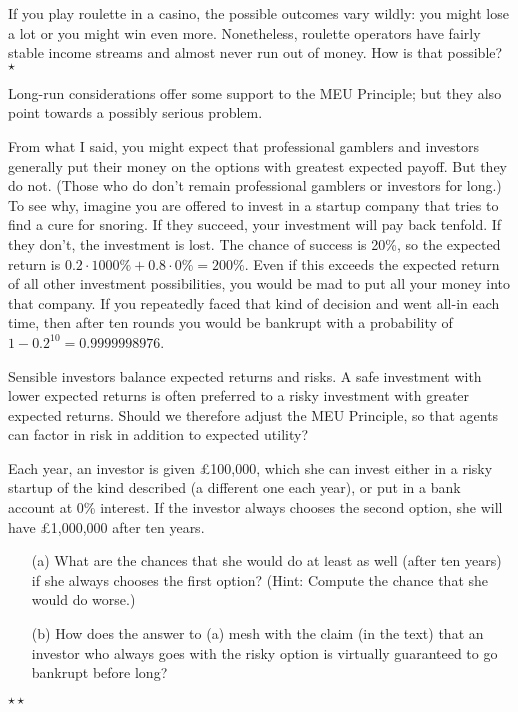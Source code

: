 \begin{exercise}
  If you play roulette in a casino, the possible outcomes vary wildly:
  you might lose a lot or you might win even more. Nonetheless,
  roulette operators have fairly stable income streams and almost
  never run out of money. How is that possible?  $\star$
\end{exercise}

Long-run considerations offer some support to the MEU Principle; but
they also point towards a possibly serious problem.

From what I said, you might expect that professional gamblers and
investors generally put their money on the options with greatest
expected payoff. But they do not. (Those who do don't remain
professional gamblers or investors for long.) To see why, imagine you
are offered to invest in a startup company that tries to find a cure
for snoring. If they succeed, your investment will pay back
tenfold. If they don't, the investment is lost. The chance of success
is 20\%, so the expected return is $0.2 \cdot 1000\% + 0.8 \cdot 0\% =
200\%$. Even if this exceeds the expected return of all other
investment possibilities, you would be mad to put all your money into
that company. If you repeatedly faced that kind of decision and went
all-in each time, then after ten rounds you would be bankrupt with a
probability of $1-0.2^{10} = 0.9999998976$.%

Sensible investors balance expected returns and risks. A safe
investment with lower expected returns is often preferred to a risky
investment with greater expected returns. Should we therefore adjust
the MEU Principle, so that agents can factor in risk in addition to
expected utility?

\begin{exercise}
  Each year, an investor is given £100,000, which she can invest
  either in a risky startup of the kind described (a different one
  each year), or put in a bank account at 0\% interest. If the
  investor always chooses the second option, she will have £1,000,000
  after ten years.
  \begin{enumerate}
  \item[(a)] What are the chances that she would do at least as well
    (after ten years) if she always chooses the first option? (Hint:
    Compute the chance that she would do worse.)
  \item[(b)] How does the answer to (a) mesh with the claim (in the
    text) that an investor who always goes with the risky option is
    virtually guaranteed to go bankrupt before long?
  \end{enumerate}
  $\star\star$
\end{exercise}


